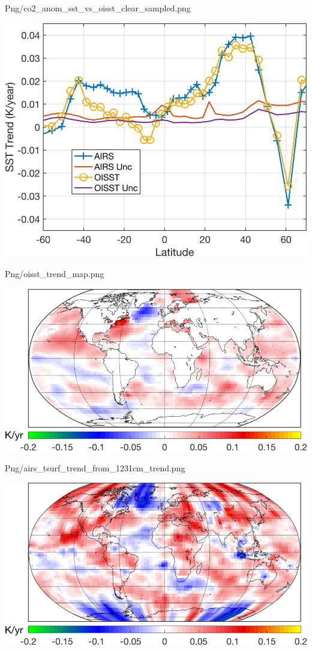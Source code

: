 \documentclass[presentation]{beamer}
\begin{document}
\begin{frame}[label={sec:orgb07954c}]{Png/co2\_anom\_sst\_vs\_oisst\_clear\_sampled.png}
\begin{center}
\includegraphics[width=0.7\linewidth]{./Figs/Png/co2_anom_sst_vs_oisst_clear_sampled.png}
\end{center}
\end{frame}

\begin{frame}[label={sec:org8b0cf7a}]{Png/oisst\_trend\_map.png}
\begin{center}
\includegraphics[width=0.7\linewidth]{./Figs/Png/oisst_trend_map.png}
\end{center}
\end{frame}

\begin{frame}[label={sec:orgf2e9184}]{Png/airs\_tsurf\_trend\_from\_1231cm\_trend.png}
\begin{center}
\includegraphics[width=0.7\linewidth]{./Figs/Png/airs_tsurf_trend_from_1231cm_trend.png}
\end{center}
\end{frame}
\end{document}
